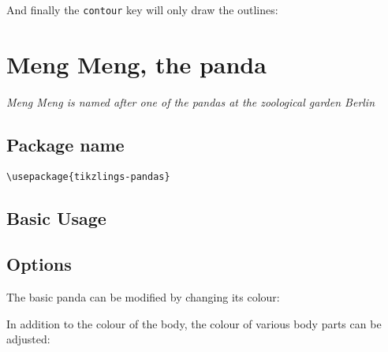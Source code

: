 \documentclass[parskip=half]{scrartcl}
\begin{document}
And finally the \lstinline|contour| key will only draw the outlines:
\begin{tcblisting}{}
\owl[contour=black]
\end{tcblisting}

%
%
\clearpage
\section[Panda]{Meng Meng, the panda}

\emph{Meng Meng is named after one of the pandas at the zoological garden Berlin}

\subsection{Package name}

\begin{tcolorbox}[lower separated=false, lefthand width=.8\linewidth]
\vspace*{0.5cm}
\lstinline|\usepackage{tikzlings-pandas}| 
\vspace*{0.5cm}
\end{tcolorbox}

\subsection{Basic Usage}

\begin{tcblisting}{}
\panda
\end{tcblisting}

\subsection{Options}

The basic panda can be modified by changing its colour:
\begin{tcblisting}{}
\panda[body=blue]
\end{tcblisting}

In addition to the colour of the body, the colour of various body parts can be adjusted:
\begin{tcblisting}{}
\panda[eye=red]
\end{tcblisting}
\begin{tcblisting}{}
\panda[pupil=red]
\end{tcblisting}
\begin{tcblisting}{}
\panda[mouth=red]
\end{tcblisting}
\end{document}

